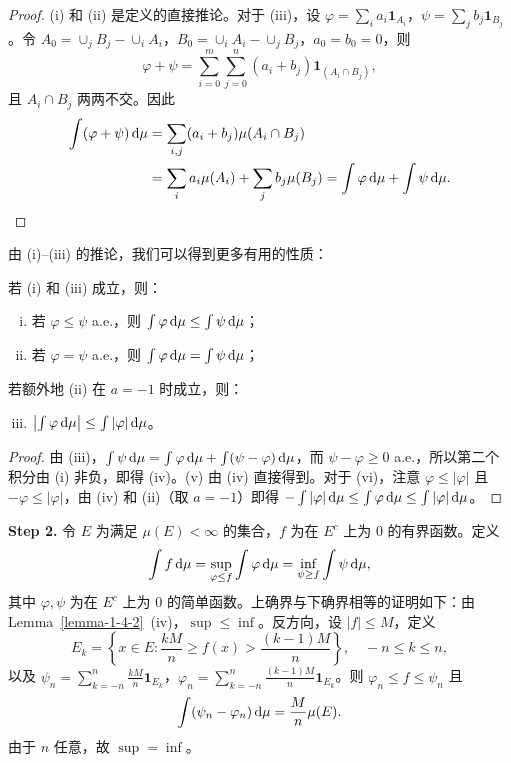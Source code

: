\begin{proof}
    (i) 和 (ii) 是定义的直接推论。对于 (iii)，设 $\varphi = \sum_i a_i \mathbf{1}_{A_i}$，$\psi = \sum_j b_j \mathbf{1}_{B_j}$。令 $A_0 = \cup_j B_j - \cup_i A_i$，$B_0 = \cup_i A_i - \cup_j B_j$，$a_0 = b_0 = 0$，则
    \[
        \varphi + \psi = \sum_{i=0}^m \sum_{j=0}^n (a_i+b_j) \mathbf{1}_{(A_i \cap B_j)},
    \]
    且 $A_i \cap B_j$ 两两不交。因此
    \begin{align*}
        \int (\varphi + \psi) \,\mathrm{d}\mu
         & = \sum_{i,j} (a_i+b_j) \mu(A_i \cap B_j)                                                         \\
         & = \sum_i a_i \mu(A_i) + \sum_j b_j \mu(B_j) = \int \varphi \,\mathrm{d}\mu + \int \psi \,\mathrm{d}\mu. \qedhere
    \end{align*}
\end{proof}

由 (i)--(iii) 的推论，我们可以得到更多有用的性质：

\begin{lemma}\label{lemma-1-4-2}
    若 (i) 和 (iii) 成立，则：
    \begin{enumerate}[(iv)]
        \item 若 $\varphi \le \psi$ a.e.，则 $\int \varphi \,\mathrm{d}\mu \le \int \psi \,\mathrm{d}\mu$；
        \item 若 $\varphi = \psi$ a.e.，则 $\int \varphi \,\mathrm{d}\mu = \int \psi \,\mathrm{d}\mu$；
    \end{enumerate}
    若额外地 (ii) 在 $a=-1$ 时成立，则：
    \begin{enumerate}[(iv)]
        \setcounter{enumi}{2}
        \item $\left|\int \varphi \,\mathrm{d}\mu\right| \le \int |\varphi| \,\mathrm{d}\mu$。
    \end{enumerate}
\end{lemma}

\begin{proof}
    由 (iii)，$\int \psi \,\mathrm{d}\mu = \int \varphi \,\mathrm{d}\mu + \int (\psi - \varphi) \,\mathrm{d}\mu$，而 $\psi - \varphi \ge 0$ a.e.，所以第二个积分由 (i) 非负，即得 (iv)。(v) 由 (iv) 直接得到。对于 (vi)，注意 $\varphi \le |\varphi|$ 且 $-\varphi \le |\varphi|$，由 (iv) 和 (ii)（取 $a=-1$）即得 $-\int |\varphi| \,\mathrm{d}\mu \le \int \varphi \,\mathrm{d}\mu \le \int |\varphi| \,\mathrm{d}\mu$。
\end{proof}

\medskip\noindent\textbf{Step 2.} 令 $E$ 为满足 $\mu(E) < \infty$ 的集合，$f$ 为在 $E^c$ 上为 $0$ 的有界函数。定义
\begin{equation}\label{eq-1-4-1}
    \int f \,\mathrm{d}\mu = \sup_{\varphi \le f} \int \varphi \,\mathrm{d}\mu = \inf_{\psi \ge f} \int \psi \,\mathrm{d}\mu,
\end{equation}
其中 $\varphi, \psi$ 为在 $E^c$ 上为 $0$ 的简单函数。上确界与下确界相等的证明如下：由 Lemma~\ref{lemma-1-4-2}~(iv)，$\sup \le \inf$。反方向，设 $|f| \le M$，定义
\[
    E_k = \left\{ x \in E : \frac{kM}{n} \ge f(x) > \frac{(k-1)M}{n} \right\}, \quad -n \le k \le n,
\]
以及 $\psi_n = \sum_{k=-n}^{n} \frac{kM}{n} \mathbf{1}_{E_k}$，$\varphi_n = \sum_{k=-n}^{n} \frac{(k-1)M}{n} \mathbf{1}_{E_k}$。则 $\varphi_n \le f \le \psi_n$ 且
\[
    \int (\psi_n - \varphi_n) \,\mathrm{d}\mu = \frac{M}{n} \mu(E).
\]
由于 $n$ 任意，故 $\sup = \inf$。

